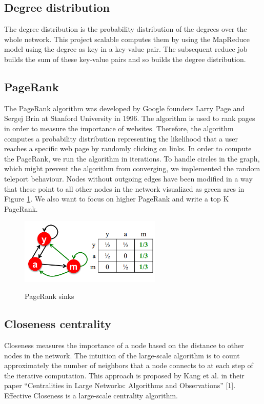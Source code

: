 \subsection{Degree distribution}
The degree distribution is the probability distribution of the degrees over the whole network. This project scalable computes them by using the MapReduce model using the degree as key in a key-value pair. The subsequent reduce job builds the sum of these key-value pairs and so builds the degree distribution.

\subsection{PageRank}
The PageRank algorithm was developed by Google founders Larry Page and Sergej Brin at Stanford University in 1996. The algorithm is used to rank pages in order to measure the importance of websites. Therefore, the algorithm computes a probability distribution representing the likelihood that a user reaches a specific web page by randomly clicking on links. In order to compute the PageRank, we run the algorithm in iterations. To handle circles in the graph, which might prevent the algorithm from converging, we implemented the random teleport behaviour. Nodes without outgoing edges have been modified in a way that these point to all other nodes in the network visualized as green arcs in Figure \ref{fig2}. We also want to focus on higher PageRank and write a top K PageRank.

\begin{figure}[H]
	\begin{center}
		\label{fig2}		
		\includegraphics[width=0.6\textwidth]{fig2}	
		\caption{PageRank sinks}	
	\end{center}
\end{figure}

\subsection{Closeness centrality}
Closeness measures the importance of a node based on the distance to other nodes in the network. The intuition of the large-scale algorithm is to count approximately the number of neighbors that a node connects to at each step of the iterative computation. This approach is proposed by Kang et al. in their paper “Centralities in Large Networks: Algorithms and Observations” [1]. Effective Closeness is a large-scale centrality algorithm. 

